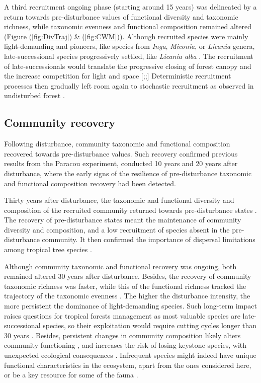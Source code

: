 \documentclass[fleqn,10pt]{ArtEcoFoG} %
\begin{document}
A third recruitment ongoing phase (starting around 15 years) was
delineated by a return towards pre-disturbance values of functional
diversity and taxonomic richness, while taxonomic evenness and
functional composition remained altered (Figure (\ref{fig:DivTraj}) \&
(\ref{fig:CWM})). Although recruited species were mainly light-demanding
and pioneers, like species from \emph{Inga}, \emph{Miconia}, or
\emph{Licania} genera, late-successional species progressively settled,
like \emph{Licania alba} \citep{Fortunel2014}. The recruitment of
late-successionals would translate the progressive closing of forest
canopy and the increase competition for light and space
{[}\citet{Peet1992};\citet{Denslow2000};{]} Deterministic recruitment
processes then gradually left room again to stochastic recruitment as
observed in undisturbed forest \citep{Lawton1988, Chave2004}.

\subsection{Community recovery}\label{community-recovery}

Following disturbance, community taxonomic and functional composition
recovered towards pre-disturbance values. Such recovery confirmed
previous results from the Paracou experiment, conducted 10 years
\citep{Molino2001} and 20 years \citep{Baraloto2012a} after disturbance,
where the early signs of the resilience of pre-disturbance taxonomic and
functional composition recovery had been detected.

Thirty years after disturbance, the taxonomic and functional diversity
and composition of the recruited community returned towards
pre-disturbance states \citep{Fukami2005, Fortunel2014}. The recovery of
pre-disturbance states meant the maintenance of community diversity and
composition, and a low recruitment of species absent in the
pre-disturbance community. It then confirmed the importance of dispersal
limitations among tropical tree species \citep{Svenning2005}.

Although community taxonomic and functional recovery was ongoing, both
remained altered 30 years after disturbance. Besides, the recovery of
community taxonomic richness was faster, while this of the functional
richness tracked the trajectory of the taxonomic evenness
\citep{Grime1998}. The higher the disturbance intensity, the more
persistent the dominance of light-demanding species. Such long-term
impact raises questions for tropical forests management as most valuable
species are late-successional species, so their exploitation would
require cutting cycles longer than 30 years \citep{Putz2012}. Besides,
persistent changes in community composition likely alters community
functioning \citep{Diaz2005}, and increases the risk of losing keystone
species, with unexpected ecological consequences
\citep{Jones1994, Chazdon2003a}. Infrequent species might indeed have
unique functional characteristics in the ecosystem, apart from the ones
considered here, or be a key resource for some of the fauna
\citep{Schleuning2016}.
\end{document}
